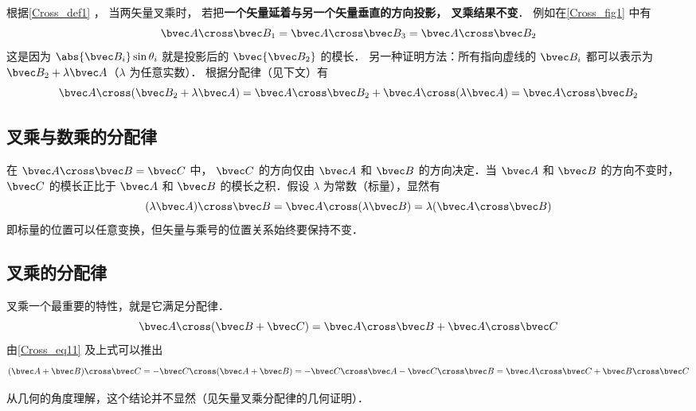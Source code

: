 根据\autoref{Cross_def1} ， 当两矢量叉乘时， 若把\textbf{一个矢量延着与另一个矢量垂直的方向投影， 叉乘结果不变}． 例如在\autoref{Cross_fig1} 中有
\begin{equation}
\bvec A\cross\bvec B_1 = \bvec A \cross \bvec B_3 = \bvec A\cross \bvec B_2
\end{equation}
这是因为 $\abs{\bvec B_i}\sin\theta_i$ 就是投影后的 $\bvec{\bvec B_2}$ 的模长． 另一种证明方法：所有指向虚线的 $\bvec B_i$ 都可以表示为 $\bvec B_2 + \lambda \bvec A$（$\lambda$ 为任意实数）． 根据分配律（见下文）有
\begin{equation}
\bvec A \cross (\bvec B_2 + \lambda \bvec A) = \bvec A \cross \bvec B_2 + \bvec A \cross (\lambda \bvec A) = \bvec A \cross \bvec B_2
\end{equation}

\subsection{叉乘与数乘的分配律}

在 $\bvec A \cross \bvec B = \bvec C$ 中， $\bvec C$ 的方向仅由 $\bvec A$ 和 $\bvec B$ 的方向决定．当 $\bvec A$ 和 $\bvec B$ 的方向不变时， $\bvec C$ 的模长正比于 $\bvec A$ 和 $\bvec B$ 的模长之积．假设 $\lambda $ 为常数（标量），显然有
\begin{equation}
(\lambda \bvec A) \cross \bvec B = \bvec A \cross (\lambda \bvec B) = \lambda (\bvec A \cross \bvec B)
\end{equation}
即标量的位置可以任意变换，但矢量与乘号的位置关系始终要保持不变．

\subsection{叉乘的分配律}

叉乘一个最重要的特性，就是它满足分配律．
\begin{equation}\label{Cross_eq6}
\bvec A \cross (\bvec B +\bvec C) = \bvec A \cross \bvec B + \bvec A \cross \bvec C
\end{equation}
由\autoref{Cross_eq11} 及上式可以推出
\begin{equation}\label{Cross_eq7}
(\bvec A + \bvec B) \cross \bvec C =  - \bvec C \cross (\bvec A + \bvec B) =  - \bvec C \cross \bvec A - \bvec C \cross \bvec B = \bvec A \cross \bvec C + \bvec B \cross \bvec C
\end{equation}

从几何的角度理解，这个结论并不显然（见矢量叉乘分配律的几何证明）．

